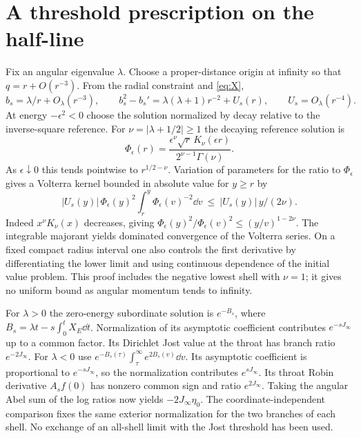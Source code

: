 \section{A threshold prescription on the half-line}\label{app:jost}
Fix an angular eigenvalue $\lambda$. Choose a proper-distance origin at infinity so that $q=r+O(r^{-3})$. From the radial constraint and \eqref{eq:X},
\[
 b_s=\lambda/r+O_\lambda(r^{-3}),\qquad
 b_s^2-b_s'=\lambda(\lambda+1)r^{-2}+U_s(r),\qquad U_s=O_\lambda(r^{-4}).
\]
At energy $-\epsilon^2<0$ choose the solution normalized by decay relative to the inverse-square reference. For $\nu=|\lambda+1/2|\ge1$ the decaying reference solution is
\[
 \Phi_\epsilon(r)=\frac{\epsilon^\nu\sqrt r\,K_\nu(\epsilon r)}
                         {2^{\nu-1}\Gamma(\nu)} .
\]
As $\epsilon\downarrow0$ this tends pointwise to $r^{1/2-\nu}$. Variation of parameters for the ratio to $\Phi_\epsilon$ gives a Volterra kernel bounded in absolute value for $y\ge r$ by
\[
 |U_s(y)|\,\Phi_\epsilon(y)^2\int_r^y\Phi_\epsilon(v)^{-2}\dd v
 \ \le\ |U_s(y)|\,y/(2\nu).
\]
Indeed $x^\nu K_\nu(x)$ decreases, giving $\Phi_\epsilon(y)^2/\Phi_\epsilon(v)^2\le(y/v)^{1-2\nu}$. The integrable majorant yields dominated convergence of the Volterra series. On a fixed compact radius interval one also controls the first derivative by differentiating the lower limit and using continuous dependence of the initial value problem. This proof includes the negative lowest shell with $\nu=1$; it gives no uniform bound as angular momentum tends to infinity.

For $\lambda>0$ the zero-energy subordinate solution is $e^{-B_s}$, where $B_s=\lambda t-s\int_0^tX_E\dd t$. Normalization of its asymptotic coefficient contributes $e^{-sJ_\infty}$ up to a common factor. Its Dirichlet Jost value at the throat has branch ratio $e^{-2J_\infty}$. For $\lambda<0$ use $e^{-B_s(\tau)}\int_\tau^\infty e^{2B_s(v)}\dd v$. Its asymptotic coefficient is proportional to $e^{-sJ_\infty}$, so the normalization contributes $e^{sJ_\infty}$. Its throat Robin derivative $A_s f(0)$ has nonzero common sign and ratio $e^{2J_\infty}$. Taking the angular Abel sum of the log ratios now yields $-2J_\infty\eta_0$. The coordinate-independent comparison fixes the same exterior normalization for the two branches of each shell. No exchange of an all-shell limit with the Jost threshold has been used.
